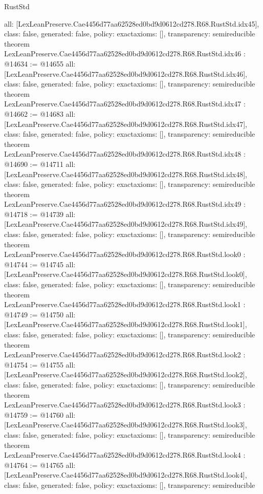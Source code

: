 \begin{lexlean}{RustStd}
\begin{coremodule}
{  all: [LexLeanPreserve.Cae4456d77aa62528ed0bd9d0612cd278.R68.RustStd.idx45],
  class: false,
  generated: false,
  policy: exact{axioms: []},
  transparency: semireducible
}
theorem LexLeanPreserve.Cae4456d77aa62528ed0bd9d0612cd278.R68.RustStd.idx46 : @14634 := @14655 {
  all: [LexLeanPreserve.Cae4456d77aa62528ed0bd9d0612cd278.R68.RustStd.idx46],
  class: false,
  generated: false,
  policy: exact{axioms: []},
  transparency: semireducible
}
theorem LexLeanPreserve.Cae4456d77aa62528ed0bd9d0612cd278.R68.RustStd.idx47 : @14662 := @14683 {
  all: [LexLeanPreserve.Cae4456d77aa62528ed0bd9d0612cd278.R68.RustStd.idx47],
  class: false,
  generated: false,
  policy: exact{axioms: []},
  transparency: semireducible
}
theorem LexLeanPreserve.Cae4456d77aa62528ed0bd9d0612cd278.R68.RustStd.idx48 : @14690 := @14711 {
  all: [LexLeanPreserve.Cae4456d77aa62528ed0bd9d0612cd278.R68.RustStd.idx48],
  class: false,
  generated: false,
  policy: exact{axioms: []},
  transparency: semireducible
}
theorem LexLeanPreserve.Cae4456d77aa62528ed0bd9d0612cd278.R68.RustStd.idx49 : @14718 := @14739 {
  all: [LexLeanPreserve.Cae4456d77aa62528ed0bd9d0612cd278.R68.RustStd.idx49],
  class: false,
  generated: false,
  policy: exact{axioms: []},
  transparency: semireducible
}
theorem LexLeanPreserve.Cae4456d77aa62528ed0bd9d0612cd278.R68.RustStd.look0 : @14744 := @14745 {
  all: [LexLeanPreserve.Cae4456d77aa62528ed0bd9d0612cd278.R68.RustStd.look0],
  class: false,
  generated: false,
  policy: exact{axioms: []},
  transparency: semireducible
}
theorem LexLeanPreserve.Cae4456d77aa62528ed0bd9d0612cd278.R68.RustStd.look1 : @14749 := @14750 {
  all: [LexLeanPreserve.Cae4456d77aa62528ed0bd9d0612cd278.R68.RustStd.look1],
  class: false,
  generated: false,
  policy: exact{axioms: []},
  transparency: semireducible
}
theorem LexLeanPreserve.Cae4456d77aa62528ed0bd9d0612cd278.R68.RustStd.look2 : @14754 := @14755 {
  all: [LexLeanPreserve.Cae4456d77aa62528ed0bd9d0612cd278.R68.RustStd.look2],
  class: false,
  generated: false,
  policy: exact{axioms: []},
  transparency: semireducible
}
theorem LexLeanPreserve.Cae4456d77aa62528ed0bd9d0612cd278.R68.RustStd.look3 : @14759 := @14760 {
  all: [LexLeanPreserve.Cae4456d77aa62528ed0bd9d0612cd278.R68.RustStd.look3],
  class: false,
  generated: false,
  policy: exact{axioms: []},
  transparency: semireducible
}
theorem LexLeanPreserve.Cae4456d77aa62528ed0bd9d0612cd278.R68.RustStd.look4 : @14764 := @14765 {
  all: [LexLeanPreserve.Cae4456d77aa62528ed0bd9d0612cd278.R68.RustStd.look4],
  class: false,
  generated: false,
  policy: exact{axioms: []},
  transparency: semireducible
}
\end{coremodule}
\end{lexlean}
